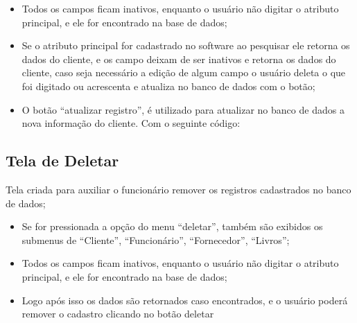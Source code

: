 \begin{itemize}
 \item Todos os campos ficam inativos, enquanto o usuário não digitar o atributo principal, e ele for encontrado na base de dados;

 \item Se o atributo principal for cadastrado no software ao pesquisar ele retorna os dados do cliente, e os campo deixam de ser inativos e retorna os dados do cliente, caso seja necessário a edição de algum campo o usuário deleta o que foi digitado ou acrescenta e atualiza no banco de dados com o botão;

 \item O botão “atualizar registro”, é utilizado para atualizar no banco de dados a nova informação do cliente. Com o seguinte código:
 \end{itemize}
 
 
\subsection{Tela de Deletar}

Tela criada para auxiliar o funcionário remover os registros cadastrados no banco de dados;

\begin{itemize}
 \item Se for pressionada a opção do menu “deletar”, também são exibidos os submenus de “Cliente”, “Funcionário”, “Fornecedor”, “Livros”;

  \item Todos os campos ficam inativos, enquanto o usuário não digitar o atributo principal, e ele for encontrado na base de dados;
  
  \item Logo após isso os dados são retornados caso encontrados, e o usuário poderá remover o cadastro clicando no botão deletar
 \end{itemize}

